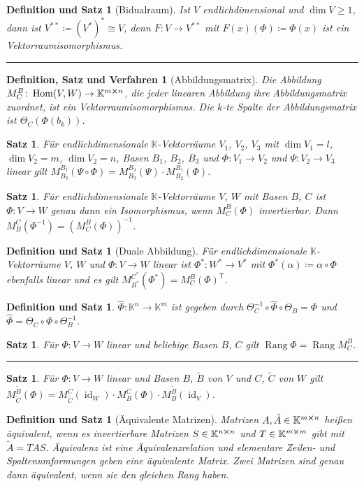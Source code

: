 \documentclass[a4paper]{article}
\newcounter{Sec}
\theoremstyle{marginbreak}
\newtheorem{satz}[definition]{Satz}
\newtheorem{defsatz}[definition]{Definition und Satz}
\newtheorem{defsatzver}[definition]{Definition, Satz und Verfahren}
\DeclareMathOperator{\Rang}{Rang}
\DeclareMathOperator{\Hom}{Hom}
\DeclareMathOperator{\id}{id}
\newcommand{\sep}{%
	\rule{\textwidth}{0.3pt}%
	\stepcounter{Sec}%
	}
\begin{document}
	\begin{defsatz}[Bidualraum]
		Ist $V$ endlichdimensional und $\dim V \geq 1$, dann ist $V^{**}\coloneqq(V^*)^*\cong V$,
		denn $F\colon V\to V^{**}$ mit $F(x)(\Phi)\coloneqq\Phi(x)$ ist ein Vektorraumisomorphismus.
	\end{defsatz}
	\sep
	\begin{defsatzver}[Abbildungsmatrix]
		Die Abbildung $M^B_C\colon\Hom(V, W)\to \mathbb{K}^{m\cross n}$, die jeder
		linearen Abbildung ihre Abbildungsmatrix zuordnet, ist ein Vektorraumisomorphismus.
		Die $k$-te Spalte der Abbildungsmatrix ist $\Theta_C(\Phi(b_k))$.
	\end{defsatzver}
	\begin{satz}
		Für endlichdimensionale $\mathbb{K}$-Vektorräume $V_1$, $V_2$, $V_3$ mit $\dim V_1=l$, $\dim V_2=m$,
		$\dim V_2=n$, Basen $B_1$, $B_2$, $B_3$ und $\Phi\colon V_1\to V_2$ und
		$\Psi\colon V_2\to V_3$ linear gilt $M_{B_3}^{B_1}(\Psi\circ\Phi) = M_{B_3}^{B_2}(\Psi)\cdot M_{B_2}^{B_1}(\Phi)$.
	\end{satz}
	\begin{satz}
		Für endlichdimensionale $\mathbb{K}$-Vektorräume $V$, $W$ mit Basen $B$, $C$ ist
		$\Phi\colon V\to W$ genau dann ein Isomorphismus, wenn $M_C^B(\Phi)$ invertierbar.
		Dann $M_B^C(\Phi^{-1}) = (M_C^B(\Phi))^{-1}$.
	\end{satz}
	\begin{defsatz}[Duale Abbildung]
		Für endlichdimensionale $\mathbb{K}$-Vektorräume $V$, $W$ und $\Phi\colon V\to W$
		linear ist $\Phi^*\colon W^*\to V^*$ mit $\Phi^*(\alpha)\coloneqq\alpha\circ\Phi$
		ebenfalls linear und es gilt $M_{B^*}^{C^*}(\Phi^*) = M_C^B(\Phi)^{\mathsf{T}}$.
	\end{defsatz}
	\begin{defsatz}
		$\hat{\Phi}\colon\mathbb{K}^n\to\mathbb{K}^m$ ist gegeben durch
		$\Theta_C^{-1}\circ\hat{\Phi}\circ\Theta_B=\Phi$ und $\hat{\Phi}=\Theta_C\circ\Phi\circ\Theta_B^{-1}$.
	\end{defsatz}
	\begin{satz}
		Für $\Phi\colon V\to W$ linear und beliebige Basen $B$, $C$ gilt $\Rang\Phi=\Rang M_C^B$.
	\end{satz}
	\sep
	\begin{satz}
		Für $\Phi\colon V\to W$ linear und Basen $B$, $\tilde{B}$ von $V$ und
		$C$, $\tilde{C}$ von $W$ gilt $M_{\tilde{C}}^{\tilde{B}}(\Phi) = M_{\tilde{C}}^C(\id_W)\cdot M_B^C(\Phi)\cdot M_B^{\tilde{B}}(\id_V)$.
	\end{satz}
	\begin{defsatz}[Äquivalente Matrizen]
		Matrizen $A, \tilde{A} \in \mathbb{K}^{m\cross n}$ heißen äquivalent, wenn es
		invertierbare Matrizen $S \in \mathbb{K}^{n\cross n}$ und $T \in \mathbb{K}^{m\cross m}$
		gibt mit $\tilde{A}=TAS$. Äquivalenz ist eine Äquivalenzrelation und elementare
		Zeilen- und Spaltenumformungen geben eine äquivalente Matrix. Zwei Matrizen sind
		genau dann äquivalent, wenn sie den gleichen Rang haben.
	\end{defsatz}
\end{document}
